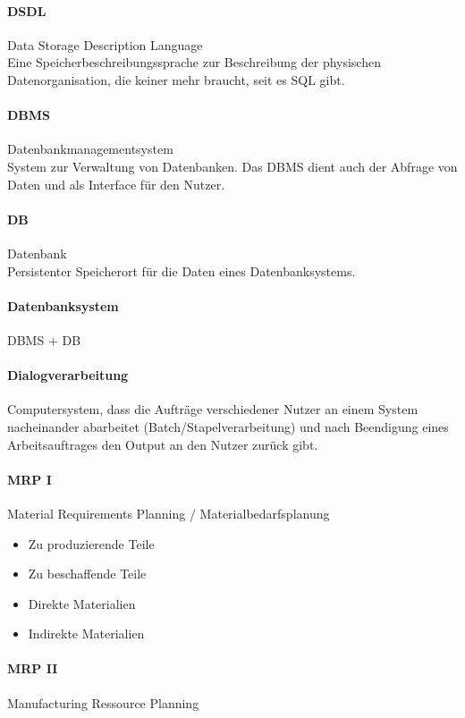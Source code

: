 \documentclass[twocolumn]{article}
\begin{document}
\paragraph{DSDL}
	Data Storage Description Language \\
	Eine Speicherbeschreibungssprache zur Beschreibung der physischen Datenorganisation, die keiner mehr braucht, seit es SQL gibt.

\paragraph{DBMS}
	Datenbankmanagementsystem \\
	System zur Verwaltung von Datenbanken. Das DBMS dient auch der Abfrage von Daten und als Interface für den Nutzer.

\paragraph{DB}
	Datenbank \\
	Persistenter Speicherort für die Daten eines Datenbanksystems.

\paragraph{Datenbanksystem}
	DBMS + DB

\paragraph{Dialogverarbeitung}
	Computersystem, dass die Aufträge verschiedener Nutzer an einem System nacheinander abarbeitet (Batch/Stapelverarbeitung) und nach Beendigung eines Arbeitsauftrages den Output an den Nutzer zurück gibt.

\paragraph{MRP I \\}
	Material Requirements Planning / Materialbedarfsplanung 
	\begin{itemize}
		\item Zu produzierende Teile
		\item Zu beschaffende Teile
		\item Direkte Materialien
		\item Indirekte Materialien
	\end{itemize}

\paragraph{MRP II}
	Manufacturing Ressource Planning 
\end{document}
